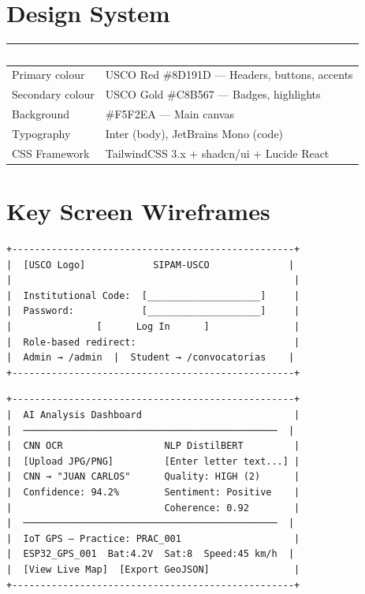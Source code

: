 \documentclass[12pt,a4paper,twoside]{report}
\begin{document}
\section{Design System}
\begin{center}
\begin{tabularx}{\textwidth}{|l|X|}
\hline
\rowcolor{tableHdr}\textcolor{white}{\textbf{Element}} & \textcolor{white}{\textbf{Specification}} \\
\hline
\rowcolor{rowOdd}Primary colour & USCO Red \#8D191D — Headers, buttons, accents \\
\hline\rowcolor{rowEven}Secondary colour & USCO Gold \#C8B567 — Badges, highlights \\
\hline\rowcolor{rowOdd}Background & \#F5F2EA — Main canvas \\
\hline\rowcolor{rowEven}Typography & Inter (body), JetBrains Mono (code) \\
\hline\rowcolor{rowOdd}CSS Framework & TailwindCSS 3.x + shadcn/ui + Lucide React \\
\hline
\end{tabularx}
\end{center}

\section{Key Screen Wireframes}

\begin{lstlisting}[caption={Login Screen Mockup},numbers=none]
+--------------------------------------------------+
|  [USCO Logo]            SIPAM-USCO              |
|                                                  |
|  Institutional Code:  [____________________]     |
|  Password:            [____________________]     |
|               [      Log In      ]               |
|  Role-based redirect:                            |
|  Admin → /admin  |  Student → /convocatorias    |
+--------------------------------------------------+
\end{lstlisting}

\begin{lstlisting}[caption={AI Dashboard (Professor View)},numbers=none]
+--------------------------------------------------+
|  AI Analysis Dashboard                           |
|  ─────────────────────────────────────────────  |
|  CNN OCR                  NLP DistilBERT         |
|  [Upload JPG/PNG]         [Enter letter text...] |
|  CNN → "JUAN CARLOS"      Quality: HIGH (2)      |
|  Confidence: 94.2%        Sentiment: Positive    |
|                           Coherence: 0.92        |
|  ─────────────────────────────────────────────  |
|  IoT GPS — Practice: PRAC_001                    |
|  ESP32_GPS_001  Bat:4.2V  Sat:8  Speed:45 km/h  |
|  [View Live Map]  [Export GeoJSON]               |
+--------------------------------------------------+
\end{lstlisting}
\end{document}

